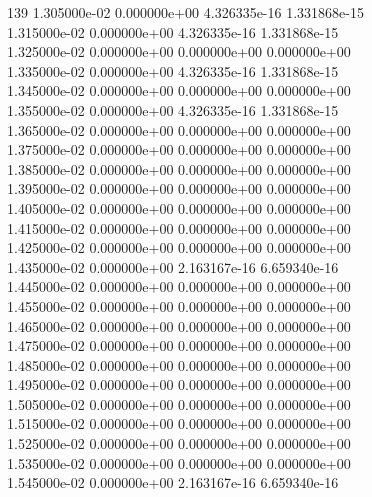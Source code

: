 139	1.305000e-02	0.000000e+00	4.326335e-16	1.331868e-15	\\ 	1.315000e-02	0.000000e+00	4.326335e-16	1.331868e-15	\\ 	1.325000e-02	0.000000e+00	0.000000e+00	0.000000e+00	\\ 	1.335000e-02	0.000000e+00	4.326335e-16	1.331868e-15	\\ 	1.345000e-02	0.000000e+00	0.000000e+00	0.000000e+00	\\ 	1.355000e-02	0.000000e+00	4.326335e-16	1.331868e-15	\\ 	1.365000e-02	0.000000e+00	0.000000e+00	0.000000e+00	\\ 	1.375000e-02	0.000000e+00	0.000000e+00	0.000000e+00	\\ 	1.385000e-02	0.000000e+00	0.000000e+00	0.000000e+00	\\ 	1.395000e-02	0.000000e+00	0.000000e+00	0.000000e+00	\\ 	1.405000e-02	0.000000e+00	0.000000e+00	0.000000e+00	\\ 	1.415000e-02	0.000000e+00	0.000000e+00	0.000000e+00	\\ 	1.425000e-02	0.000000e+00	0.000000e+00	0.000000e+00	\\ 	1.435000e-02	0.000000e+00	2.163167e-16	6.659340e-16	\\ 	1.445000e-02	0.000000e+00	0.000000e+00	0.000000e+00	\\ 	1.455000e-02	0.000000e+00	0.000000e+00	0.000000e+00	\\ 	1.465000e-02	0.000000e+00	0.000000e+00	0.000000e+00	\\ 	1.475000e-02	0.000000e+00	0.000000e+00	0.000000e+00	\\ 	1.485000e-02	0.000000e+00	0.000000e+00	0.000000e+00	\\ 	1.495000e-02	0.000000e+00	0.000000e+00	0.000000e+00	\\ 	1.505000e-02	0.000000e+00	0.000000e+00	0.000000e+00	\\ 	1.515000e-02	0.000000e+00	0.000000e+00	0.000000e+00	\\ 	1.525000e-02	0.000000e+00	0.000000e+00	0.000000e+00	\\ 	1.535000e-02	0.000000e+00	0.000000e+00	0.000000e+00	\\ 	1.545000e-02	0.000000e+00	2.163167e-16	6.659340e-16	\\ \hline
